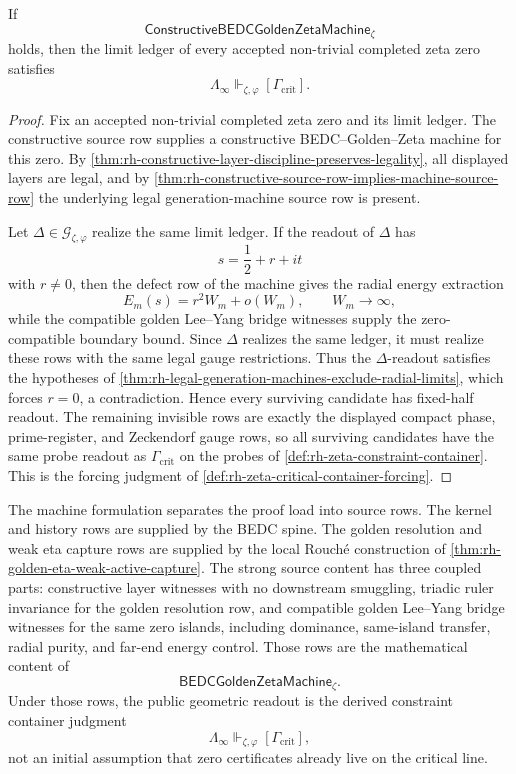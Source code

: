 \begin{theorem}
\label{thm:rh-constructive-machines-force-critical-container}
If
$$
\mathsf{ConstructiveBEDCGoldenZetaMachine}_{\zeta}
$$
holds, then the limit ledger of every accepted non-trivial completed
zeta zero satisfies
$$
\Lambda_{\infty}
\Vdash_{\zeta,\varphi}
[\Gamma_{\mathrm{crit}}].
$$
\end{theorem}

\begin{proof}
Fix an accepted non-trivial completed zeta zero and its limit ledger.
The constructive source row supplies a constructive
BEDC--Golden--Zeta machine for this zero.  By
\autoref{thm:rh-constructive-layer-discipline-preserves-legality}, all
displayed layers are legal, and by
\autoref{thm:rh-constructive-source-row-implies-machine-source-row} the
underlying legal generation-machine source row is present.

Let $\Delta\in\mathcal G_{\zeta,\varphi}$ realize the same limit ledger.
If the readout of $\Delta$ has
$$
s=\frac12+r+it
$$
with $r\ne0$, then the defect row of the machine gives the radial
energy extraction
$$
E_m(s)=r^2W_m+o(W_m),
\qquad
W_m\to\infty,
$$
while the compatible golden Lee--Yang bridge witnesses supply the
zero-compatible boundary bound.  Since $\Delta$ realizes the same
ledger, it must realize these rows with the same legal gauge restrictions.
Thus the $\Delta$-readout satisfies the hypotheses of
\autoref{thm:rh-legal-generation-machines-exclude-radial-limits}, which
forces $r=0$, a contradiction.  Hence every surviving candidate has
fixed-half readout.  The remaining invisible rows are exactly the
displayed compact phase, prime-register, and Zeckendorf gauge rows, so
all surviving candidates have the same probe readout as
$\Gamma_{\mathrm{crit}}$ on the probes of
\autoref{def:rh-zeta-constraint-container}.  This is the forcing
judgment of \autoref{def:rh-zeta-critical-container-forcing}.
\end{proof}

\begin{principle}
\label{prin:rh-bedc-golden-zeta-machine-proof-load}
The machine formulation separates the proof load into source rows.  The
kernel and history rows are supplied by the BEDC spine.  The golden
resolution and weak eta capture rows are supplied by the local
Rouch\'e construction of
\autoref{thm:rh-golden-eta-weak-active-capture}.  The strong source
content has three coupled parts: constructive layer witnesses with no
downstream smuggling, triadic ruler invariance for the golden resolution
row, and compatible golden Lee--Yang bridge witnesses for the same zero
islands, including dominance, same-island transfer, radial purity, and
far-end energy control.  Those rows are the mathematical content of
$$
\mathsf{BEDCGoldenZetaMachine}_{\zeta}.
$$
Under those rows, the public geometric readout is the derived constraint
container judgment
$$
\Lambda_{\infty}
\Vdash_{\zeta,\varphi}
[\Gamma_{\mathrm{crit}}],
$$
not an initial assumption that zero certificates already live on the
critical line.
\end{principle}


